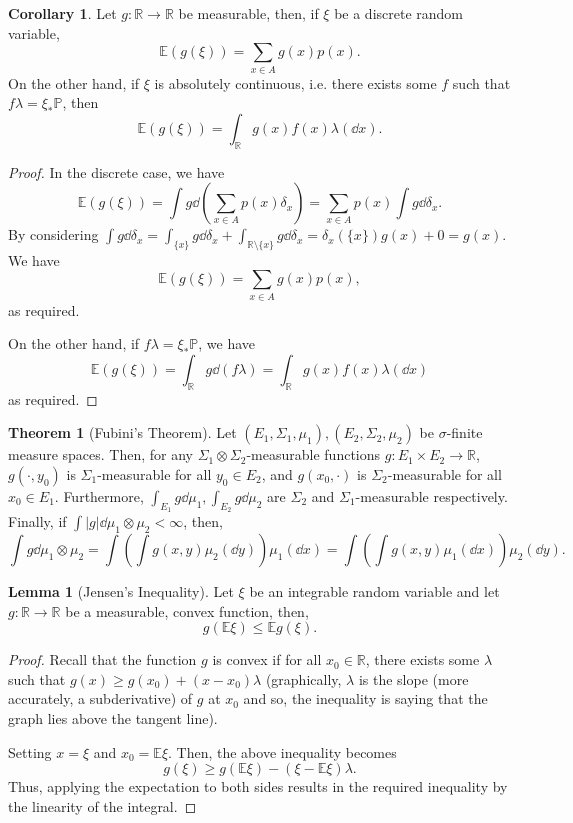 \documentclass[]{article}
\theoremstyle{definition}
\newtheorem{theorem}{Theorem}
\newtheorem{corollary}{Corollary}[theorem]
\theoremstyle{definition}
\newtheorem{lemma}{Lemma}[section]
\begin{document}
\begin{corollary}
  Let \(g : \mathbb{R} \to \mathbb{R}\) be measurable, then, if 
  \(\xi\) be a discrete random variable, 
  \[\mathbb{E}(g(\xi)) = \sum_{x \in A}g(x) p(x).\]
  On the other hand, if \(\xi\) is absolutely continuous, i.e. there exists 
  some \(f\) such that \(f\lambda = \xi_* \mathbb{P}\), then 
  \[\mathbb{E}(g(\xi)) = \int_{\mathbb{R}}g(x)f(x) \lambda(\dd x).\]
\end{corollary}
\begin{proof}
  In the discrete case, we have 
  \[\mathbb{E}(g(\xi)) = \int g \dd \left(\sum_{x \in A}p(x) \delta_x\right) = 
    \sum_{x \in A} p(x) \int g \dd \delta_x.\]
  By considering \(\int g \dd \delta_x = \int_{\{x\}} g \dd \delta_x + 
  \int_{\mathbb{R} \setminus \{x\}} g \dd \delta_x = \delta_x(\{x\})g(x) + 0 = g(x)\).
  We have 
  \[\mathbb{E}(g(\xi)) = \sum_{x \in A}g(x) p(x),\]
  as required.

  On the other hand, if \(f\lambda = \xi_* \mathbb{P}\), we have
  \[\mathbb{E}(g(\xi)) = \int_{\mathbb{R}} g \dd (f \lambda) = \int_{\mathbb{R}} g(x)f(x) \lambda(\dd x)\]
  as required.
\end{proof}

\begin{theorem}[Fubini's Theorem]
  Let \((E_1, \Sigma_1, \mu_1), (E_2, \Sigma_2, \mu_2)\) be \(\sigma\)-finite 
  measure spaces. Then, for any \(\Sigma_1 \otimes \Sigma_2\)-measurable 
  functions \(g : E_1 \times E_2 \to \mathbb{R}\), \(g(\cdot, y_0)\) is 
  \(\Sigma_1\)-measurable for all \(y_0 \in E_2\), and \(g(x_0, \cdot)\) is 
  \(\Sigma_2\)-measurable for all \(x_0 \in E_1\). Furthermore, 
  \(\int_{E_1} g \dd \mu_1, \int_{E_2} g \dd \mu_2\) are \(\Sigma_2\) and \(\Sigma_1\)-measurable 
  respectively. Finally, if \(\int |g| \dd \mu_1 \otimes \mu_2 < \infty\),
  then, 
  \[\int g \dd \mu_1 \otimes \mu_2 = \int \left(\int g(x, y) \mu_2(\dd y)\right) \mu_1(\dd x) 
   = \int \left(\int g(x, y) \mu_1(\dd x)\right) \mu_2(\dd y).\]
\end{theorem}

\begin{lemma}[Jensen's Inequality]
  Let \(\xi\) be an integrable random variable and let \(g : \mathbb{R} \to \mathbb{R}\)
  be a measurable, convex function, then,
  \[g(\mathbb{E} \xi) \le \mathbb{E}g(\xi).\]
\end{lemma}
\begin{proof}
  Recall that the function \(g\) is convex if for all \(x_0 \in \mathbb{R}\), there 
  exists some \(\lambda\) such that \(g(x) \ge g(x_0) + (x - x_0) \lambda\)
  (graphically, \(\lambda\) is the slope (more accurately, a subderivative) of 
  \(g\) at \(x_0\) and so, the inequality is saying that the graph lies above the 
  tangent line). 

  Setting \(x = \xi\) and \(x_0 = \mathbb{E}\xi\). Then, the above inequality becomes 
  \[g(\xi) \ge g(\mathbb{E}\xi) - (\xi - \mathbb{E}\xi)\lambda.\]
  Thus, applying the expectation to both sides results in the required inequality 
  by the linearity of the integral.
\end{proof}
\end{document}
